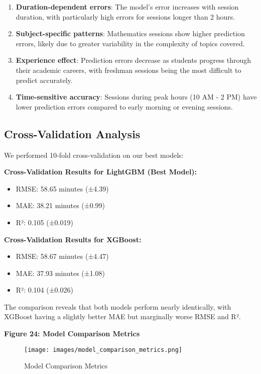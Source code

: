 \documentclass[12pt,letterpaper]{article}
\begin{document}
\begin{enumerate}
    \item \textbf{Duration-dependent errors}: The model's error increases with session duration, with particularly high errors for sessions longer than 2 hours.

    \item \textbf{Subject-specific patterns}: Mathematics sessions show higher prediction errors, likely due to greater variability in the complexity of topics covered.

    \item \textbf{Experience effect}: Prediction errors decrease as students progress through their academic careers, with freshman sessions being the most difficult to predict accurately.

    \item \textbf{Time-sensitive accuracy}: Sessions during peak hours (10 AM - 2 PM) have lower prediction errors compared to early morning or evening sessions.
\end{enumerate}

\subsection{Cross-Validation Analysis}

We performed 10-fold cross-validation on our best models:

\textbf{Cross-Validation Results for LightGBM (Best Model):}
\begin{itemize}
    \item RMSE: 58.65 minutes (±4.39)
    \item MAE: 38.21 minutes (±0.99)
    \item R²: 0.105 (±0.019)
\end{itemize}

\textbf{Cross-Validation Results for XGBoost:}
\begin{itemize}
    \item RMSE: 58.67 minutes (±4.47)
    \item MAE: 37.93 minutes (±1.08)
    \item R²: 0.104 (±0.026)
\end{itemize}

The comparison reveals that both models perform nearly identically, with XGBoost having a slightly better MAE but marginally worse RMSE and R².

\textbf{Figure 24: Model Comparison Metrics}

\begin{figure}[H]
    \centering
    \texttt{[image: images/model\_comparison\_metrics.png]}
    \caption{Model Comparison Metrics}
\end{figure}
\end{document}
